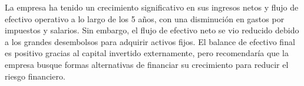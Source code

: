 

La empresa ha tenido un crecimiento significativo en sus ingresos netos y flujo de efectivo operativo a lo largo de los 5 años, con una disminución en gastos por impuestos y salarios. Sin embargo, el flujo de efectivo neto se vio reducido debido a los grandes desembolsos para adquirir activos fijos. El balance de efectivo final es positivo gracias al capital invertido externamente, pero recomendaría que la empresa busque formas alternativas de financiar su crecimiento para reducir el riesgo financiero.